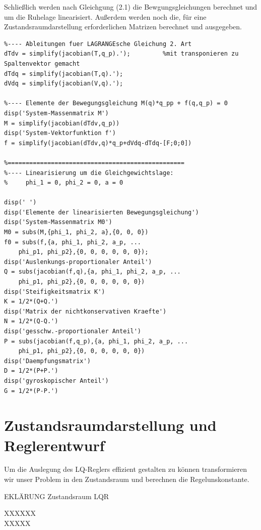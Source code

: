 \documentclass[a4paper, 10pt]{report}
\begin{document}
Schließlich werden nach Gleichgung (2.1) die Bewgungsgleichungen berechnet und um die Ruhelage linearisiert. Außerdem werden noch die, für eine Zustandsraumdarstellung erforderlichen Matrizen berechnet und ausgegeben.
\begin{lstlisting}
%---- Ableitungen fuer LAGRANGEsche Gleichung 2. Art
dTdv = simplify(jacobian(T,q_p).');         %mit transponieren zu Spaltenvektor gemacht
dTdq = simplify(jacobian(T,q).');
dVdq = simplify(jacobian(V,q).');

%---- Elemente der Bewegungsgleichung M(q)*q_pp + f(q,q_p) = 0
disp('System-Massenmatrix M')
M = simplify(jacobian(dTdv,q_p))
disp('System-Vektorfunktion f')
f = simplify(jacobian(dTdv,q)*q_p+dVdq-dTdq-[F;0;0])

%=================================================
%---- Linearisierung um die Gleichgewichtslage:
%     phi_1 = 0, phi_2 = 0, a = 0

disp(' ')
disp('Elemente der linearisierten Bewegungsgleichung')
disp('System-Massenmatrix M0')
M0 = subs(M,{phi_1, phi_2, a},{0, 0, 0})
f0 = subs(f,{a, phi_1, phi_2, a_p, ...
    phi_p1, phi_p2},{0, 0, 0, 0, 0, 0});
disp('Auslenkungs-proportionaler Anteil')
Q = subs(jacobian(f,q),{a, phi_1, phi_2, a_p, ...
    phi_p1, phi_p2},{0, 0, 0, 0, 0, 0})
disp('Steifigkeitsmatrix K')
K = 1/2*(Q+Q.')
disp('Matrix der nichtkonservativen Kraefte')
N = 1/2*(Q-Q.')
disp('gesschw.-proportionaler Anteil')
P = subs(jacobian(f,q_p),{a, phi_1, phi_2, a_p, ...
    phi_p1, phi_p2},{0, 0, 0, 0, 0, 0})
disp('Daempfungsmatrix')
D = 1/2*(P+P.')
disp('gyroskopischer Anteil')
G = 1/2*(P-P.')
 \end{lstlisting}

\section{Zustandsraumdarstellung und Reglerentwurf}
Um die Auslegung des LQ-Reglers effizient gestalten zu können transformieren wir unser Problem in den Zustandsraum und berechnen die Regelunskonstante. 

EKLÄRUNG Zustandsraum LQR 

XXXXXX \\
XXXXX \\
\end{document}

